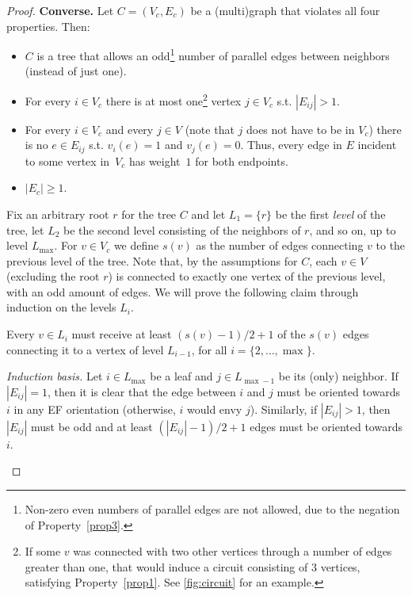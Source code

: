 \begin{proof}
    \textbf{Converse.} Let $C=(V_c,E_c)$ be a (multi)graph that violates all four properties. Then:
    \begin{itemize}
        \item $C$ is a tree that allows an odd\footnote{Non-zero even numbers of parallel edges are not allowed, due to the negation of Property~\ref{prop3}.} number of parallel edges between neighbors (instead of just one).
        \item For every $i \in V_c$ there is at most one\footnote{If some $v$ was connected with two other vertices through a number of edges greater than one, that would induce a circuit consisting of $3$ vertices, satisfying Property~\ref{prop1}. See \cref{fig:circuit} for an example.} vertex $j\in V_c$ s.t. $|E_{ij}|>1$.
        \item For every $i \in V_c$ and every $j \in V$ (note that $j$ does not have to be in $V_c$) there is no $e\in E_{ij}$ s.t. $v_i(e)=1$ and $v_j(e)=0$. Thus, every edge in $E$ incident to some vertex in~$V_c$ has weight~$1$ for both endpoints.
        \item $|E_c| \geq 1$.
    \end{itemize}

    Fix an arbitrary root $r$ for the tree $C$ and let $L_1 =\{r\}$ be the first \emph{level} of the tree, let $L_2$ be the second level consisting of the neighbors of $r$, and so on, up to level $L_{\max}$. For $v\in V_c$ we define $s(v)$ as the number of edges connecting $v$ to the previous level of the tree. Note that, by the assumptions for $C$, each $v\in V$ (excluding the root $r$) is connected to exactly one vertex of the previous level, with an odd amount of edges. We will prove the following claim through induction on the levels $L_i$.

    \begin{claim}\label{claim:induction_tree}
        Every $v\in L_{i}$ must receive at least $(s(v)-1)/2 +1$ of the $s(v)$ edges connecting it to a vertex of level $L_{i-1}$, for all $i=\{2,\ldots,\max\}$.
    \end{claim}

    \begin{nestedproof}

    \emph{Induction basis.} Let $i\in L_{\max}$ be a leaf and $j\in L_{\max-1}$ be its (only) neighbor. If $|E_{ij}|=1$, then it is clear that the edge between $i$ and $j$ must be oriented towards $i$ in any EF orientation (otherwise, $i$ would envy $j$). Similarly, if $|E_{ij}|>1$, then $|E_{ij}|$ must be odd and at least $(|E_{ij}|-1)/2 +1$ edges must be oriented towards $i$.


\end{nestedproof}
\end{proof}
